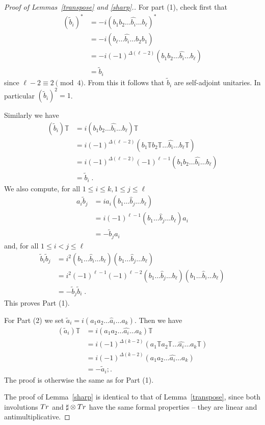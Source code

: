 \documentclass[10pt,a4paper]{amsart}
\def\T{{\mathbb T}}
\begin{document}
\begin{proof}[Proof of Lemmas~\ref{transpose} and \ref{sharp}.]
For part (1), check first that
\begin{align*}
(\widetilde b_i)^* &= -i (b_1 b_2 \dots \widehat{b_i} \dots b_\ell)^* \\
	&= -i (b_\ell \dots \widehat{b_i} \dots b_2 b_1) \\
	&= -i (-1)^{\Delta(\ell-2)} (b_1 b_2 \dots \widehat{b_i} \dots b_\ell) \\
	&= \widetilde b_i 
\end{align*}
since $\ell-2 \equiv 2 \pmod 4$. From this it follows that $\widetilde b_i$ are self-adjoint unitaries. In particular $(\widetilde b_i)^2 = 1$.

Similarly we have
\begin{align*}
(\widetilde b_i)\T &=  i (b_1 b_2 \dots \widehat{b_i} \dots b_\ell)\T \\
	& = i (-1)^{\Delta(\ell-2)} (b_1\T b_2\T \dots \widehat{b_i} \dots b_\ell\T) \\
	&= i (-1)^{\Delta(\ell-2)} (-1)^{\ell-1} (b_1 b_2 \dots \widehat{b_i} \dots b_\ell) \\
	&= \widetilde b_i \; .
\end{align*}
We also compute, for all $1 \leq i \leq k, 1 \leq j \leq \ell$
\begin{align*}
a_i \widetilde b_j &= i a_i (b_1 \dots \widehat{b}_j \dots b_\ell) \\
	&= i (-1)^{\ell-1} (b_1 \dots \widehat{b}_j \dots b_\ell) a_i \\
	&= - \widetilde b_j a_i
\end{align*}
and, for all $1 \leq i < j \leq \ell$
\begin{align*}
\widetilde b_i \widetilde b_j 
	&= i^2 (b_1 \dots \widehat{b}_i \dots b_\ell)(b_1 \dots \widehat{b}_j \dots b_\ell) \\
	&= i^2 (-1)^{\ell-1} (-1)^{\ell-2} (b_1 \dots \widehat{b}_j \dots b_\ell)(b_1 \dots \widehat{b}_i \dots b_\ell) \\
	&= - \widetilde b_j \widetilde b_i \; .
\end{align*}
This proves Part (1).

For Part (2) we set $\widetilde a_i = i (a_1 a_2 \dots \widehat a _i \dots a_k)$. 
Then we have 
\begin{align*}
(\widetilde a_i)\T &=  i (a_1 a_2 \dots \widehat{a_i} \dots a_k)\T \\
	& = i (-1)^{\Delta(k-2)} (a_1\T a_2\T \dots \widehat{a_i} \dots a_k\T) \\
	&= i (-1)^{\Delta(k-2)}  (a_1 a_2 \dots \widehat{a_i} \dots a_k) \\
	&= - \widetilde a_i; .
\end{align*}
The proof is otherwise the same  as for Part (1). 

The proof of Lemma~\ref{sharp} is identical to that of Lemma~\ref{transpose}, since both involutions ${\rm Tr}$ and $\sharp \otimes {\rm Tr}$ have the same formal properties -- they are linear and antimultiplicative.
\end{proof}
\end{document}
